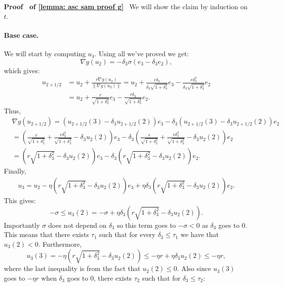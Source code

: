 \documentclass[11pt]{article}
\newcommand{\rad}{r}
\renewenvironment{proof}[1][]{%
  \par\noindent\textbf{\upshape Proof%
  \if\relax\detokenize{#1}\relax\else\ #1\fi}\ %
}{\jmlrQED}
\begin{document}
\begin{proof}[of \cref{lemma: asc sam proof g}]\label{proof: asc sam proof g}
We will show the claim by induction on $t$. 

\paragraph{Base case.} We will start by computing $u_4$.  
Using all we've proved we get:
$$\nabla g(u_2) = -\delta_3\sigma (e_3 - \delta_3 e_2),$$
which gives:
\begin{align*}
    u_{2+1/2} & = u_2 + \frac{\rad \nabla g(u_2)}{\|\nabla g(u_2)\|} = u_2 + \frac{\rad\delta_3}{\delta_3\sqrt{1+ \delta_3^2}}e_3 - \frac{\rad \delta_3^2}{\delta_3\sqrt{ 1+ \delta_3^2}}e_2 \\
    & = u_2 + \frac{\rad}{\sqrt{1+ \delta_3^2}}e_3 - \frac{\rad \delta_3}{\sqrt{ 1+ \delta_3^2}}e_2.
\end{align*}
Thus,
\begin{align*}
    & \nabla g(u_{2+1/2}) = (u_{2+1/2}(3) - \delta_3 u_{2+1/2}(2)) e_{3} -\delta_3 (u_{2+1/2}(3) - \delta_3 u_{2+1/2}(2)) e_{2} \\
    & = \left(\frac{\rad}{\sqrt{1+\delta_3^2}} + \frac{\rad  \delta_3^2}{\sqrt{1+ \delta_3^2}} -\delta_3 u_2(2)\right)e_{3} - \delta_3\left(\frac{\rad}{\sqrt{1+\delta_3^2}} + \frac{\rad  \delta_3^2}{\sqrt{1+ \delta_3^2}} -\delta_3 u_2(2)\right)e_{2} \\
    & = \left(\rad  \sqrt{1+ \delta_3^2} - \delta_3 u_2(2)\right) e_3 - \delta_3 \left(\rad  \sqrt{1+ \delta_3^2} - \delta_3 u_2(2)\right) e_{2}. 
\end{align*}
Finally, 
\begin{align*}
    u_3 = u_2 - \eta \left(\rad  \sqrt{1+ \delta_3^2} - \delta_3 u_2(2)\right) e_3 + \eta \delta_3 \left(\rad  \sqrt{1+ \delta_3^2} - \delta_3 u_2(2)\right) e_{2}. 
\end{align*} 
This gives:
$$- \sigma \leq u_3(2) = -\sigma +  \eta \delta_3 \left(\rad  \sqrt{1+ \delta_3^2} - \delta_3 u_2(2)\right).$$
Importantly $\sigma$ does not depend on $\delta_3$ so this term goes to $-\sigma < 0$ as $\delta_3$ goes to $0$. This means that there exists $\tau_1$ such that for every $\delta_3 \leq \tau_1$ we have that $u_3(2) < 0$. Furthermore,
$$u_{3}(3) = -\eta \left(\rad  \sqrt{1+ \delta_3^2} - \delta_3 u_2(2)\right) \leq -\eta \rad  + \eta \delta_3 u_2(2) \leq -\eta \rad,$$
where the last inequality is from the fact that $u_2(2) \leq 0$. Also since $u_3(3)$ goes to $-\eta \rad$ when $\delta_3$ goes to $0$, there exists $\tau_2$ such that for $\delta_3 \leq \tau_2$: 

\end{proof}
\end{document}
